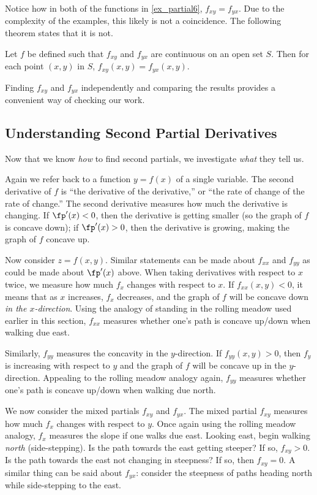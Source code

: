 Notice how in both of the functions in \autoref{ex_partial6}, $f_{xy} = f_{yx}$. Due to the complexity of the examples, this likely is not a coincidence. The following theorem states that it is not.

{Let $f$ be defined such that $f_{xy}$ and $f_{yx}$ are continuous on an open set $S$. Then for each point $(x,y)$ in $S$, $f_{xy}(x,y) = f_{yx}(x,y)$.}

Finding $f_{xy}$ and $f_{yx}$ independently and comparing the results provides a convenient way of checking our work.

\subsection{Understanding Second Partial Derivatives}

Now that we know \textit{how} to find second partials, we investigate \textit{what} they tell us. 

Again we refer back to a function $y=f(x)$ of a single variable. The second derivative of $f$ is ``the derivative of the derivative,'' or ``the rate of change of the rate of change.'' The second derivative measures how much the derivative is changing. If $\fp'(x)<0$, then the derivative is getting smaller (so the graph of $f$ is concave down); if $\fp'(x)>0$, then the derivative is growing, making the graph of $f$ concave up. 

Now consider $z=f(x,y)$. Similar statements can be made about $f_{xx}$ and $f_{yy}$ as could be made about $\fp'(x)$ above. When taking derivatives with respect to $x$ twice, we measure how much $f_x$ changes with respect to $x$. If $f_{xx}(x,y)<0$, it means that as $x$ increases, $f_x$ decreases, and the graph of $f$ will be concave down \textit{in the $x$-direction}. Using the analogy of standing in the rolling meadow used earlier in this section, $f_{xx}$ measures whether one's path is concave up/down when walking due east.

Similarly, $f_{yy}$ measures the concavity in the $y$-direction. If $f_{yy}(x,y)>0$, then $f_y$ is increasing with respect to $y$ and the graph of $f$ will be concave up in the $y$-direction. Appealing to the rolling meadow analogy again, $f_{yy}$ measures whether one's path is concave up/down when walking due north.

We now consider the mixed partials $f_{xy}$ and $f_{yx}$. The mixed partial $f_{xy}$ measures how much $f_x$ changes with respect to $y$. Once again using the rolling meadow analogy, $f_{x}$ measures the slope if one walks due east. Looking east, begin walking \textit{north} (side-stepping). Is the path towards the east getting steeper? If so, $f_{xy}>0$. Is the path towards the east not changing in steepness? If so, then $f_{xy}=0$. A similar thing can be said about $f_{yx}$: consider the steepness of paths heading north while side-stepping to the east.

